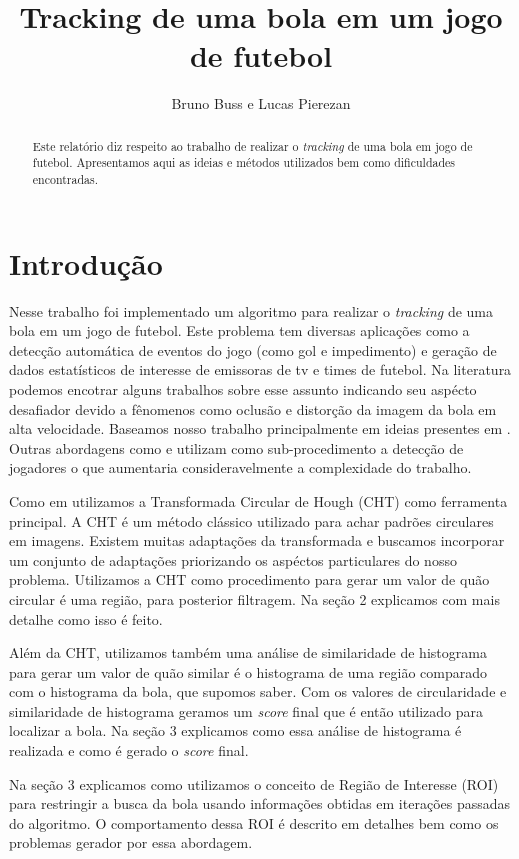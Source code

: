 \documentclass[11pt,a4paper]{article}
\title{Tracking de uma bola em um jogo de futebol}
\author{Bruno Buss e Lucas Pierezan}
\begin{document}
\maketitle

\begin{abstract}
 Este relatório diz respeito ao trabalho de realizar o \textit{tracking} de uma bola em jogo de futebol. Apresentamos aqui as ideias e métodos utilizados bem como dificuldades encontradas.
\end{abstract}

\section{Introdução}
 Nesse trabalho foi implementado um algoritmo para realizar o \textit{tracking} de uma bola em um jogo de futebol. Este problema tem diversas aplicações como a detecção automática de eventos do jogo (como gol e impedimento) e geração de dados estatísticos de interesse de emissoras de tv e times de futebol. Na literatura podemos encotrar alguns trabalhos sobre esse assunto \cite{D'Orazio}\cite{Choi}\cite{Tong} indicando seu aspécto desafiador devido a fênomenos como oclusão e distorção da imagem da bola em alta velocidade. Baseamos nosso trabalho principalmente em ideias presentes em \cite{D'Orazio}. Outras abordagens como \cite{Choi} e \cite{Tong} utilizam como sub-procedimento a detecção de jogadores o que aumentaria consideravelmente a complexidade do trabalho.

Como em \cite{D'Orazio} utilizamos a Transformada Circular de Hough (CHT) como ferramenta principal. A CHT é um método clássico utilizado para achar padrões circulares em imagens. Existem muitas adaptações da transformada\cite{Yuen} e buscamos incorporar um conjunto de adaptações priorizando os aspéctos particulares do nosso problema. Utilizamos a CHT como procedimento para gerar um valor de quão circular é uma região, para posterior filtragem. Na seção 2 explicamos com mais detalhe como isso é feito.

Além da CHT, utilizamos também uma análise de similaridade de histograma para gerar um valor de quão similar é o histograma de uma região comparado com o histograma da bola, que supomos saber. Com os valores de circularidade e similaridade de histograma geramos um \textit{score} final que é então utilizado para localizar a bola. Na seção 3 explicamos como essa análise de histograma é realizada e como é gerado o \textit{score} final.

Na seção 3 explicamos como utilizamos o conceito de Região de Interesse (ROI) para restringir a busca da bola usando informações obtidas em iterações passadas do algoritmo. O comportamento dessa ROI é descrito em detalhes bem como os problemas gerador por essa abordagem.
\end{document}
